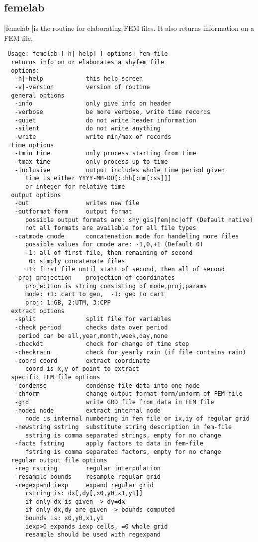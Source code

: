 \subsection{femelab}
|femelab |is the routine for elaborating FEM files. It also returns
information on a FEM file.

\begin{verbatim}
 Usage: femelab [-h|-help] [-options] fem-file
  returns info on or elaborates a shyfem file
  options:
   -h|-help            this help screen
   -v|-version         version of routine
  general options
   -info               only give info on header
   -verbose            be more verbose, write time records
   -quiet              do not write header information
   -silent             do not write anything
   -write              write min/max of records
  time options
   -tmin time          only process starting from time
   -tmax time          only process up to time
   -inclusive          output includes whole time period given
      time is either YYYY-MM-DD[::hh[:mm[:ss]]]
      or integer for relative time
  output options
   -out                writes new file
   -outformat form     output format
      possible output formats are: shy|gis|fem|nc|off (Default native)
      not all formats are available for all file types
   -catmode cmode      concatenation mode for handeling more files
      possible values for cmode are: -1,0,+1 (Default 0)
      -1: all of first file, then remaining of second
       0: simply concatenate files
      +1: first file until start of second, then all of second
   -proj projection    projection of coordinates
      projection is string consisting of mode,proj,params
      mode: +1: cart to geo,  -1: geo to cart
      proj: 1:GB, 2:UTM, 3:CPP
  extract options
   -split              split file for variables
   -check period       checks data over period
    period can be all,year,month,week,day,none
   -checkdt            check for change of time step
   -checkrain          check for yearly rain (if file contains rain)
   -coord coord        extract coordinate
      coord is x,y of point to extract
  specific FEM file options
   -condense           condense file data into one node
   -chform             change output format form/unform of FEM file
   -grd                write GRD file from data in FEM file
   -nodei node         extract internal node
      node is internal numbering in fem file or ix,iy of regular grid
   -newstring sstring  substitute string description in fem-file
      sstring is comma separated strings, empty for no change
   -facts fstring      apply factors to data in fem-file
      fstring is comma separated factors, empty for no change
  regular output file options
   -reg rstring        regular interpolation
   -resample bounds    resample regular grid
   -regexpand iexp     expand regular grid
      rstring is: dx[,dy[,x0,y0,x1,y1]]
      if only dx is given -> dy=dx
      if only dx,dy are given -> bounds computed
      bounds is: x0,y0,x1,y1
      iexp>0 expands iexp cells, =0 whole grid
      resample should be used with regexpand
\end{verbatim}

